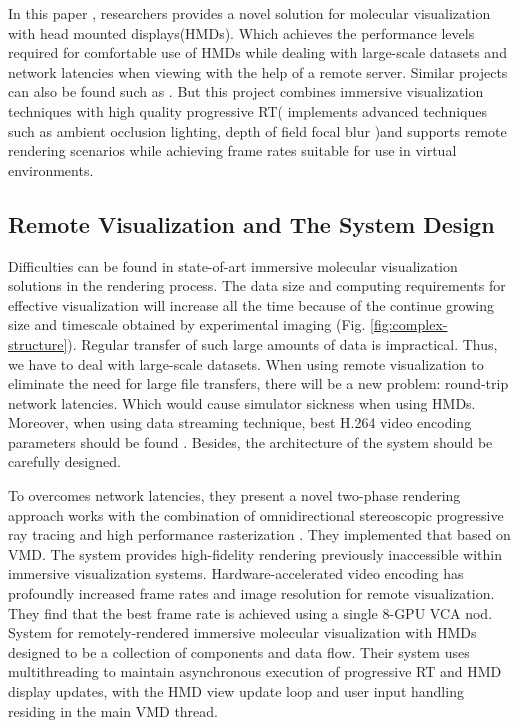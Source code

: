 \documentclass[10pt,twocolumn,letterpaper]{article}
\begin{document}
In this paper \cite{stone_immersive_2016}, researchers provides a novel solution for molecular visualization with head mounted displays(HMDs). Which achieves the performance levels required for comfortable use of HMDs while dealing with large-scale datasets and network latencies when viewing with the help of a remote server. Similar projects can also be found such as \cite{IMAX} \cite{Marsalek}. But this project combines immersive visualization techniques with high quality progressive RT( implements advanced techniques such as ambient occlusion lighting, depth of field focal blur )and supports remote rendering scenarios while achieving frame rates suitable for use in virtual environments. 

\subsection{Remote Visualization and The System Design}

Difficulties can be found in state-of-art immersive molecular visualization solutions in the rendering process. The data size and computing requirements for effective visualization will increase all the time because of the continue growing size and timescale obtained by experimental imaging (Fig. \ref{fig:complex-structure}). Regular transfer of such large amounts of data is impractical. Thus, we have to deal with large-scale datasets. When using remote visualization to eliminate the need for large file transfers, there will be a new problem: round-trip network latencies. Which would cause simulator sickness when using HMDs. Moreover, when using data streaming technique, best H.264 video encoding parameters should be found \cite{1218189}. Besides, the architecture of the system should be carefully designed.

To overcomes network latencies, they present a novel two-phase rendering approach works with the combination of omnidirectional stereoscopic progressive ray tracing and high performance rasterization \cite{hprsgpu}. They implemented that based on VMD. The system provides high-fidelity rendering previously inaccessible within immersive visualization systems. Hardware-accelerated video encoding has profoundly increased frame rates and image resolution for remote visualization. They find that the best frame rate is achieved using a single 8-GPU VCA nod. System for remotely-rendered immersive molecular visualization with HMDs designed to be a collection of components and data flow. Their system uses multithreading to maintain asynchronous execution of progressive RT and HMD display updates, with the HMD view update loop and user input handling residing in the main VMD thread.
\end{document}
